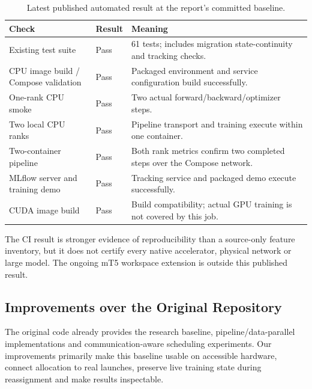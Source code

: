 \begin{table}[H]
\centering\small
\caption{Latest published automated result at the report's committed baseline.}
\begin{tabularx}{\textwidth}{P{3.7cm}P{1.4cm}Y}
\toprule
\textbf{Check} & \textbf{Result} & \textbf{Meaning}\\
\midrule
Existing test suite & Pass & 61 tests; includes migration state-continuity and tracking checks.\\
CPU image build / Compose validation & Pass & Packaged environment and service configuration build successfully.\\
One-rank CPU smoke & Pass & Two actual forward/backward/optimizer steps.\\
Two local CPU ranks & Pass & Pipeline transport and training execute within one container.\\
Two-container pipeline & Pass & Both rank metrics confirm two completed steps over the Compose network.\\
MLflow server and training demo & Pass & Tracking service and packaged demo execute successfully.\\
CUDA image build & Pass & Build compatibility; actual GPU training is not covered by this job.\\
\bottomrule
\end{tabularx}
\end{table}

The CI result is stronger evidence of reproducibility than a source-only feature inventory, but it does not certify every native accelerator, physical network or large model. The ongoing mT5 workspace extension is outside this published result.

\subsection{Improvements over the Original Repository}

The original code already provides the research baseline, pipeline/data-parallel implementations and communication-aware scheduling experiments. Our improvements primarily make this baseline usable on accessible hardware, connect allocation to real launches, preserve live training state during reassignment and make results inspectable.

